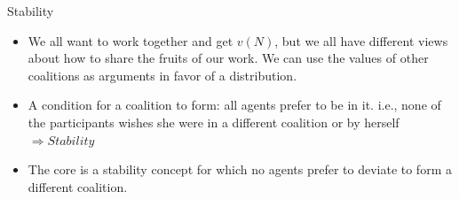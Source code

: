 \documentclass{beamer}
\begin{document}
\begin{frame}{Stability}
    \begin{itemize}
        \item We all want to work together and get $v(N)$, but we all have different views about how to share the fruits of our work. We can use the values of other coalitions as arguments in favor of a distribution.
        \item A condition for a coalition to form:
            {\color{blue}all} agents prefer to be in it. i.e., none of the participants wishes she were in a different coalition or by herself {\color{blue} $\Rightarrow Stability$ }
        \item The {\color{blue} core} is a stability concept for which no agents prefer to deviate to form a different coalition.
    \end{itemize}
\end{frame}
\end{document}
